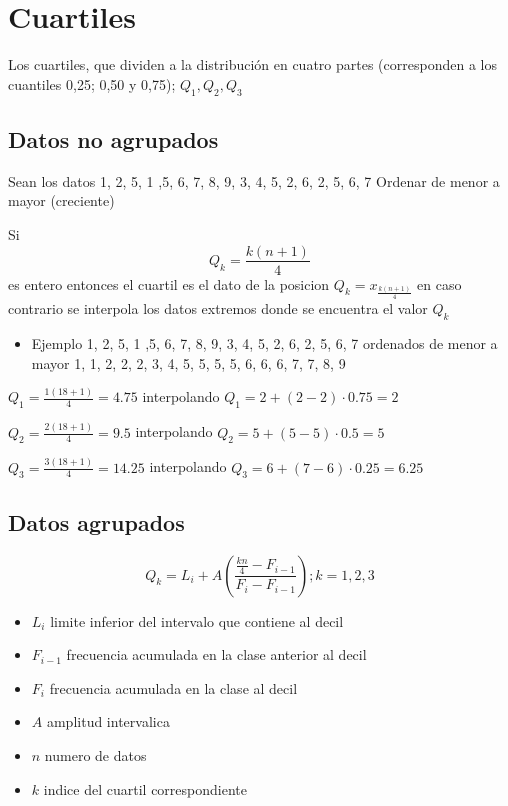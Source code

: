 \documentclass[10pt,]{krantz}
\providecommand{\tightlist}{%
  \setlength{\itemsep}{0pt}\setlength{\parskip}{0pt}}
\theoremstyle{definition}
\theoremstyle{definition}
\theoremstyle{definition}
\theoremstyle{definition}
\theoremstyle{remark}
\begin{document}
\hypertarget{cuartiles}{%
\section{Cuartiles}\label{cuartiles}}

Los cuartiles, que dividen a la distribución en cuatro partes (corresponden a los cuantiles 0,25; 0,50 y 0,75); \(Q_1, Q_2, Q_3\)

\hypertarget{datos-no-agrupados}{%
\subsection{Datos no agrupados}\label{datos-no-agrupados}}

Sean los datos 1, 2, 5, 1 ,5, 6, 7, 8, 9, 3, 4, 5, 2, 6, 2, 5, 6, 7 Ordenar de menor a mayor (creciente)

Si \[Q_k=\frac{k(n+1)}{4}\] es entero entonces el cuartil es el dato de la posicion \(Q_k=x_\frac{k(n+1)}{4}\) en caso contrario se interpola los datos extremos donde se encuentra el valor \(Q_k\)

\begin{itemize}
\tightlist
\item
  Ejemplo 1, 2, 5, 1 ,5, 6, 7, 8, 9, 3, 4, 5, 2, 6, 2, 5, 6, 7 ordenados de menor a mayor 1, 1, 2, 2, 2, 3, 4, 5, 5, 5, 5, 6, 6, 6, 7, 7, 8, 9
\end{itemize}

\(Q_1=\frac{1(18+1)}{4}=4.75\) interpolando \(Q_1=2+(2-2)\cdot 0.75=2\)

\(Q_2=\frac{2(18+1)}{4}=9.5\) interpolando \(Q_2=5+(5-5)\cdot 0.5=5\)

\(Q_3=\frac{3(18+1)}{4}=14.25\) interpolando \(Q_3=6+(7-6)\cdot 0.25=6.25\)

\hypertarget{datos-agrupados}{%
\subsection{Datos agrupados}\label{datos-agrupados}}

\[Q_k=L_i+ A\left(\frac{\frac{kn}{4}-F_{i-1}}{F_i-F_{i-1}}\right);k=1,2,3\]

\begin{itemize}
\tightlist
\item
  \(L_i\) limite inferior del intervalo que contiene al decil
\item
  \(F_{i-1}\) frecuencia acumulada en la clase anterior al decil
\item
  \(F_i\) frecuencia acumulada en la clase al decil
\item
  \(A\) amplitud intervalica
\item
  \(n\) numero de datos
\item
  \(k\) indice del cuartil correspondiente
\end{itemize}
\end{document}
